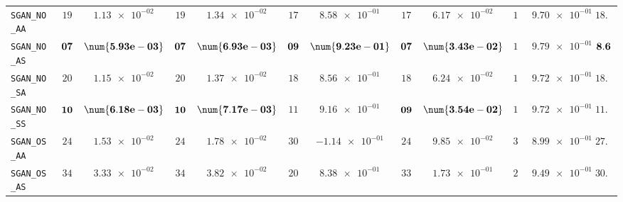 \begin{xltabular}{\textwidth}{l||cC|cC|cC|cC|cC||c}
	\texttt{SGAN\_NO\_AA} & $ 19$ & $ \num{1.13e-02}$ & $ 19$ & $ \num{1.34e-02}$ & $ 17$ & $ \num{8.58e-01}$ & $ 17$ & $ \num{6.17e-02}$ & $ 19$ & $ \num{9.70e-01}$ & $ 18.2$  \\
	\texttt{SGAN\_NO\_AS} & $\bf 07$ & $\bf \num{5.93e-03}$ & $\bf 07$ & $\bf \num{6.93e-03}$ & $\bf 09$ & $\bf \num{9.23e-01}$ & $\bf 07$ & $\bf \num{3.43e-02}$ & $ 13$ & $ \num{9.79e-01}$ & $\bf 8.6$  \\
	\texttt{SGAN\_NO\_SA} & $ 20$ & $ \num{1.15e-02}$ & $ 20$ & $ \num{1.37e-02}$ & $ 18$ & $ \num{8.56e-01}$ & $ 18$ & $ \num{6.24e-02}$ & $ 16$ & $ \num{9.72e-01}$ & $ 18.4$  \\
	\texttt{SGAN\_NO\_SS} & $\bf 10$ & $\bf \num{6.18e-03}$ & $\bf 10$ & $\bf \num{7.17e-03}$ & $ 11$ & $ \num{9.16e-01}$ & $\bf 09$ & $\bf \num{3.54e-02}$ & $ 17$ & $ \num{9.72e-01}$ & $ 11.4$  \\
	\texttt{SGAN\_OS\_AA} & $ 24$ & $ \num{1.53e-02}$ & $ 24$ & $ \num{1.78e-02}$ & $ 30$ & $ \num{-1.14e-01}$ & $ 24$ & $ \num{9.85e-02}$ & $ 36$ & $ \num{8.99e-01}$ & $ 27.6$  \\
	\texttt{SGAN\_OS\_AS} & $ 34$ & $ \num{3.33e-02}$ & $ 34$ & $ \num{3.82e-02}$ & $ 20$ & $ \num{8.38e-01}$ & $ 33$ & $ \num{1.73e-01}$ & $ 29$ & $ \num{9.49e-01}$ & $ 30.0$  \\

\end{xltabular}
